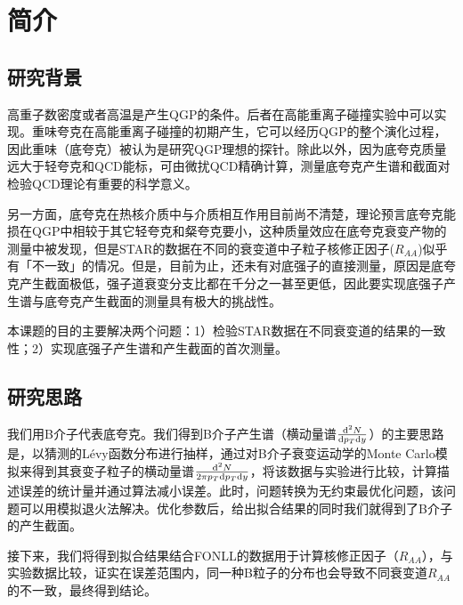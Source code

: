 \documentclass[12pt, a4paper]{ctexart}
\begin{document}
\tableofcontents

\section{简介} %
\label{sec:简介}

\subsection{研究背景} %
\label{sub:物理背景}

高重子数密度或者高温是产生QGP的条件。后者在高能重离子碰撞实验中可以实现。重味夸克在高能重离子碰撞的初期产生，它可以经历QGP的整个演化过程，因此重味（底夸克）被认为是研究QGP理想的探针。除此以外，因为底夸克质量远大于轻夸克和QCD能标，可由微扰QCD精确计算，测量底夸克产生谱和截面对检验QCD理论有重要的科学意义。\par
另一方面，底夸克在热核介质中与介质相互作用目前尚不清楚，理论预言底夸克能损在QGP中相较于其它轻夸克和粲夸克要小，这种质量效应在底夸克衰变产物的测量中被发现，但是STAR的数据在不同的衰变道中子粒子核修正因子($R_{AA}$)似乎有「不一致」的情况。\cite{SI2020135465}但是，目前为止，还未有对底强子的直接测量，原因是底夸克产生截面极低，强子道衰变分支比都在千分之一甚至更低，因此要实现底强子产生谱与底夸克产生截面的测量具有极大的挑战性。
\par
本课题的目的主要解决两个问题：1）检验STAR数据在不同衰变道的结果的一致性；2）实现底强子产生谱和产生截面的首次测量。\par

\subsection{研究思路} %
\label{sub:研究思路}
我们用B介子代表底夸克。我们得到B介子产生谱（横动量谱$\frac{\mathrm{d} ^2N}{\mathrm{d} p_T\mathrm{d} y}$）的主要思路是，以猜测的L\'evy函数分布进行抽样，通过对B介子衰变运动学的Monte Carlo模拟来得到其衰变子粒子的横动量谱$\frac{\mathrm{d} ^2N}{2\pi p_T\mathrm{d} p_T\mathrm{d} y}$，将该数据与实验进行比较，计算描述误差的统计量并通过算法减小误差。此时，问题转换为无约束最优化问题，该问题可以用模拟退火法解决。优化参数后，给出拟合结果的同时我们就得到了B介子的产生截面。\par
接下来，我们将得到拟合结果结合FONLL\cite{cacciari2012theoretical}的数据用于计算核修正因子（$R_{AA}$），与实验数据\cite{Tang:2020ame}比较，证实在误差范围内，同一种B粒子的分布也会导致不同衰变道$R_{AA}$的不一致，最终得到结论。

\end{document}
